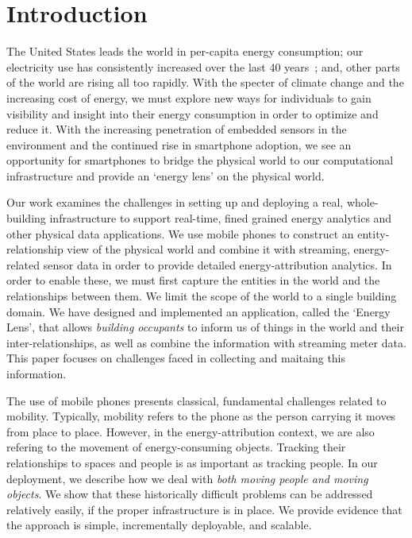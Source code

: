 \section{Introduction}
The United States leads the world in per-capita energy consumption; 
our electricity use has consistently increased over the last 40 years~\cite{oecd2011}; and, other parts of the world are rising all 
too rapidly.  With the specter of climate change and the increasing cost of energy, we must explore new
ways for individuals to gain visibility and insight into their energy consumption in order to optimize and reduce it. 
With the increasing penetration of embedded sensors in the environment and
the continued rise in smartphone adoption, we see an opportunity for smartphones to bridge the physical world
to our computational infrastructure and provide an `energy lens' on the physical world.  

Our work examines the challenges in setting up and deploying a real, whole-building infrastructure to support real-time, 
fined grained energy analytics and other physical data applications.  We use mobile phones to construct an entity-relationship 
view of the physical world and combine it with streaming, energy-related 
sensor data in order to provide detailed energy-attribution analytics.  In order to enable these, we must first capture the entities
in the world and the relationships between them.  We limit the scope of the world to a single building domain.  We have 
designed and implemented an application, called the `Energy Lens', that allows \emph{building occupants} to inform us 
of things in the world and their inter-relationships, as well as combine the information with streaming meter data.  This paper focuses
on challenges faced in collecting and maitaing this information.

The use of mobile phones presents classical, fundamental challenges related to mobility.  Typically, mobility
refers to the phone as the person carrying it moves from place to place.  However, in the energy-attribution
context, we are also refering to the movement of energy-consuming objects.  Tracking their relationships to spaces 
and people is as important as tracking people.  In our deployment, we describe how we deal with \emph{both moving people and 
moving objects}.  We show that these historically difficult problems can be addressed relatively easily, if the proper infrastructure is 
in place.  We provide evidence that the approach is simple, incrementally deployable, and scalable.

